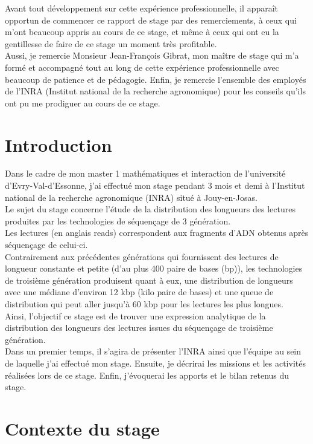 \documentclass[11pt,a4paper]{article} %
\begin{document}
Avant tout développement sur cette expérience professionnelle, il apparaît opportun de commencer ce rapport de stage par des remerciements, à ceux qui m’ont beaucoup appris au cours de ce stage, et même à ceux qui ont eu la gentillesse de faire de ce stage un moment très profitable.\\

Aussi, je remercie Monsieur Jean-François Gibrat, mon maître de stage qui m’a formé et accompagné tout au long de cette expérience professionnelle avec beaucoup de patience et de pédagogie. Enfin, je remercie l’ensemble des employés de l'INRA (Institut national de la recherche agronomique) pour les conseils qu’ils ont pu me prodiguer au cours de ce stage.
\newpage
\tableofcontents
\newpage
\section{Introduction}
\vspace{2cm}
Dans le cadre de mon master 1 mathématiques et interaction de l'université d'Evry-Val-d'Essonne, j'ai effectué mon stage pendant 3 mois et demi à l'Institut national de la recherche agronomique (INRA) situé à Jouy-en-Josas.\\
Le  sujet du stage concerne l'étude de la distribution des longueurs des lectures produites par les technologies de séquençage de 3\ieme{} génération. \\
Les lectures (en anglais reads) correspondent aux fragments d'ADN obtenus après séquençage de celui-ci.\\
Contrairement aux précédentes générations qui fournissent des lectures de longueur constante et petite (d'au plus 400 paire de bases (bp)), les technologies de troisième
génération produisent quant à eux, une distribution de longueurs avec une médiane 
d'environ 12 kbp (kilo paire de bases) et une queue de distribution qui peut aller jusqu'à 60 kbp pour les lectures les plus longues. \\[0.5cm]
Ainsi, l'objectif ce stage est de trouver une expression analytique de la distribution des longueurs des lectures issues du séquençage de troisième génération. \\[0.5cm]
Dans un premier temps, il s'agira de présenter l'INRA ainsi que l'équipe au sein de laquelle j'ai effectué mon stage. Ensuite, je décrirai les missions et les activités réalisées lors de ce stage. Enfin,  j'évoquerai les apports et le bilan retenus du stage.

\newpage
\section{Contexte du stage} 
\end{document}
